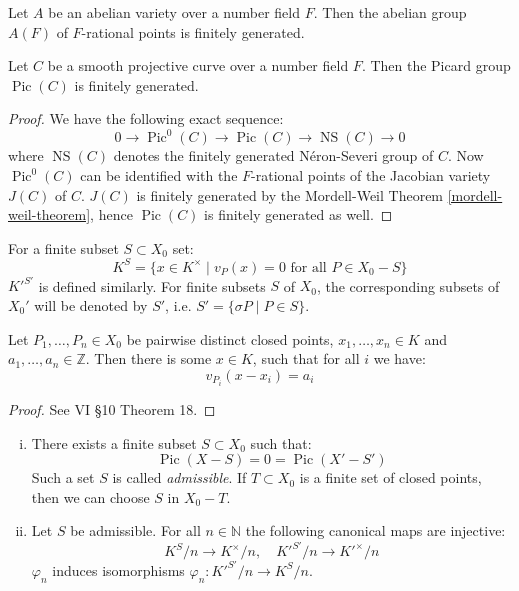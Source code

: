 \begin{theorem}\label{mordell-weil-theorem}
Let $A$ be an abelian variety over a number field $F$. Then the abelian group $A(F)$ of $F$-rational points is finitely generated.
\end{theorem}

\begin{corollary}\label{mordell-weil-corollary}
Let $C$ be a smooth projective curve over a number field $F$. Then the Picard group $\operatorname{Pic}(C)$ is finitely generated.
\end{corollary}

\begin{proof}
We have the following exact sequence:
\[ 0\longrightarrow \operatorname{Pic}^0(C) \longrightarrow\operatorname{Pic}(C) \longrightarrow \operatorname{NS}(C) \longrightarrow 0  \]
where $\operatorname{NS}(C)$ denotes the finitely generated Néron-Severi group of $C$. Now $\operatorname{Pic}^0(C)$ can be identified with the $F$-rational points of the Jacobian variety $J(C)$ of $C$. $J(C)$ is finitely generated by the Mordell-Weil Theorem \ref{mordell-weil-theorem}, hence $\operatorname{Pic}(C)$ is finitely generated as well.
\end{proof}

\begin{definition}\label{4.4}
For a finite subset $S\subset X_0$ set:
\[ K^S=\{x\in K^\times \mid v_P(x)=0\text{ for all }P\in X_0 -  S \} \]
$K'^{S'}$ is defined similarly. For finite subsets $S$ of $X_0$, the corresponding subsets of $X_0'$ will be denoted by $S'$, i.e. $S'=\{\sigma P\mid P\in S \} $.
\end{definition}

\begin{theorem}\label{weak-approximation}
Let $P_1,\ldots,P_n\in X_0$ be pairwise distinct closed points, $x_1,\ldots,x_n\in K$ and $a_1,\ldots,a_n\in\mathbb{Z}$. Then there is some $x\in K$, such that for all $i$ we have:
\[ v_{P_i}(x-x_i) = a_i \]
\end{theorem}

\begin{proof}
See \cite{ZS60} VI §10 Theorem 18.
\end{proof}

\begin{lemma}\label{4.5}
\begin{enumerate}[(i)]
\item There exists a finite subset $S\subset X_0$ such that:
\[ \operatorname{Pic}(X -  S)=0=\operatorname{Pic}(X' -  S') \]
Such a set $S$ is called \textit{admissible}. If $T\subset X_0$ is a finite set of closed points, then we can choose $S$ in $X_0 -  T$.
\item Let $S$ be admissible. For all $n\in\mathbb{N}$ the following canonical maps are injective:
\[ K^S/n \to K^\times /n,\quad K'^{S'}/n\to K'^\times /n \]
$\varphi_n$ induces isomorphisms $\varphi_n: K'^{S'}/n\to K^S/n$.
\end{enumerate}
\end{lemma}

